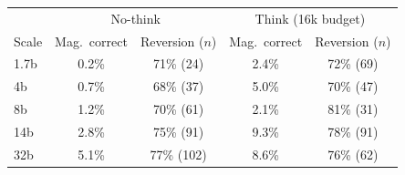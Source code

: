 \begin{tabular}{lcccc}
\toprule
 & \multicolumn{2}{c}{No-think} & \multicolumn{2}{c}{Think (16k budget)}\\
Scale & Mag.\ correct & Reversion ($n$) & Mag.\ correct & Reversion ($n$)\\
\midrule
1.7b & 0.2\% & 71\% (24) & 2.4\% & 72\% (69) \\
4b & 0.7\% & 68\% (37) & 5.0\% & 70\% (47) \\
8b & 1.2\% & 70\% (61) & 2.1\% & 81\% (31) \\
14b & 2.8\% & 75\% (91) & 9.3\% & 78\% (91) \\
32b & 5.1\% & 77\% (102) & 8.6\% & 76\% (62) \\
\bottomrule
\end{tabular}
